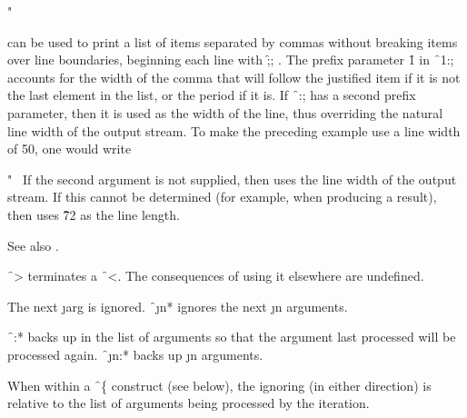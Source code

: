 \code
 "~%
\endcode

can be used to print a list of items separated by commas without
breaking items over line boundaries, beginning each line with
\f{;; }.  The prefix parameter 
\f{1} in \f{~1:;} accounts for the width of the
comma that will follow the justified item if it is not the last
element in the list, or the period 
if it is.  If \f{~:;} has a second
prefix parameter, then it is used as the width of the line,
thus overriding the natural line width of the output stream.  To make
the preceding example use a line width of 50, one would write
     
\code
 "~%
\endcode
If the second argument is not supplied, then  uses the
line width of the  output stream.
If this cannot be determined (for example, when producing a 
 result), then  uses \f{72} as the line length.

See also \secref\TildeLessThanLogicalBlock.

\endsubsubsection%



\f{~>} terminates a \f{~<}.
The consequences of using it elsewhere are undefined.

\endsubsubsection%

\endsubsection%



                                                
The next \j{arg} is ignored.
\f{~\j{n}*} ignores the next \j{n} arguments.

\f{~:*} backs up in the list of
arguments so that the argument last processed will be processed again.
\f{~\j{n}:*} backs up \j{n} arguments.

When within a \f{~\{} construct
(see below), the ignoring (in either direction) is relative to the list
of arguments being processed by the iteration.

